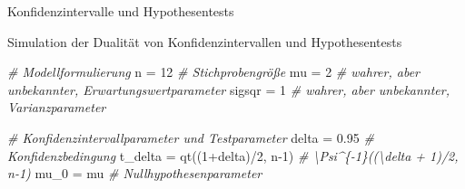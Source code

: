 \documentclass[
  8pt,
  ignorenonframetext,
]{beamer}
\newenvironment{Shaded}{\begin{snugshade}}{\end{snugshade}}
\newcommand{\CommentTok}[1]{\textcolor[rgb]{0.56,0.35,0.01}{\textit{#1}}}
\newcommand{\DecValTok}[1]{\textcolor[rgb]{0.00,0.00,0.81}{#1}}
\newcommand{\FloatTok}[1]{\textcolor[rgb]{0.00,0.00,0.81}{#1}}
\newcommand{\FunctionTok}[1]{\textcolor[rgb]{0.00,0.00,0.00}{#1}}
\newcommand{\NormalTok}[1]{#1}
\newcommand{\OtherTok}[1]{\textcolor[rgb]{0.56,0.35,0.01}{#1}}
\newcommand{\SpecialCharTok}[1]{\textcolor[rgb]{0.00,0.00,0.00}{#1}}
\begin{document}
\begin{frame}[fragile]{Konfidenzintervalle und Hypothesentests}
\protect\hypertarget{konfidenzintervalle-und-hypothesentests-2}{}
\vspace{2mm}

Simulation der Dualität von Konfidenzintervallen und Hypothesentests
\vspace{1mm} \tiny {}

\begin{Shaded}
\begin{Highlighting}[]
\CommentTok{\# Modellformulierung}
\NormalTok{n       }\OtherTok{=} \DecValTok{12}                                          \CommentTok{\# Stichprobengröße}
\NormalTok{mu      }\OtherTok{=} \DecValTok{2}                                           \CommentTok{\# wahrer, aber unbekannter, Erwartungswertparameter}
\NormalTok{sigsqr  }\OtherTok{=} \DecValTok{1}                                           \CommentTok{\# wahrer, aber unbekannter, Varianzparameter}

\CommentTok{\# Konfidenzintervallparameter und Testparameter}
\NormalTok{delta   }\OtherTok{=} \FloatTok{0.95}                                        \CommentTok{\# Konfidenzbedingung}
\NormalTok{t\_delta }\OtherTok{=} \FunctionTok{qt}\NormalTok{((}\DecValTok{1}\SpecialCharTok{+}\NormalTok{delta)}\SpecialCharTok{/}\DecValTok{2}\NormalTok{, n}\DecValTok{{-}1}\NormalTok{)                        }\CommentTok{\# \textbackslash{}Psi\^{}\{{-}1\}((\textbackslash{}delta + 1)/2, n{-}1)}
\NormalTok{mu\_0    }\OtherTok{=}\NormalTok{ mu                                          }\CommentTok{\# Nullhypothesenparameter }


\end{Highlighting}
\end{Shaded}
\end{frame}
\end{document}
